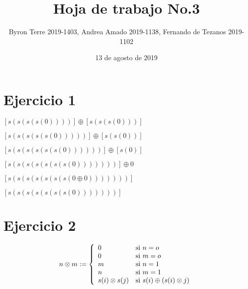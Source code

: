\documentclass{article}
\author{Byron Terre 2019-1403, Andrea Amado 2019-1138, Fernando de Tezanos 2019-1102}
\title{Hoja de trabajo No.3}
\date{13 de agosto de 2019}
\begin{document}
\linespread{1.1}

\maketitle

\section{Ejercicio 1}\par
\begin{center}

$[s(s(s(s(0))))] \oplus [s(s(s(0)))]$ 
\end{center}
\begin{center}
$[s(s(s(s(s(0)))))] \oplus [s(s(0))] $
\end{center}
\begin{center}
$[s(s(s(s(s(s(0))))))] \oplus [s(0)]$ 
\end{center}
\begin{center}
$[s(s(s(s(s(s(s(0)))))))] \oplus 0 $
\end{center}
\begin{center}
$[s(s(s(s(s(s(s(0\oplus 0)))))))]$
\end{center}
\begin{center}
$[s(s(s(s(s(s(s(0)))))))]$
\end{center}
\section{Ejercicio 2}
\[
n\otimes m := \left\{
\begin{array}{l l}
0 & \mbox{si } n=o \\
0 & \mbox{si } m=o \\
m & \mbox{si } n=1 \\
n & \mbox{si } m=1 \\ 
s(i)\otimes s(j) & \mbox{si } s(i) \oplus (s(i)\otimes j)\\
\end{array}
\right.
 \]
\end{document}
